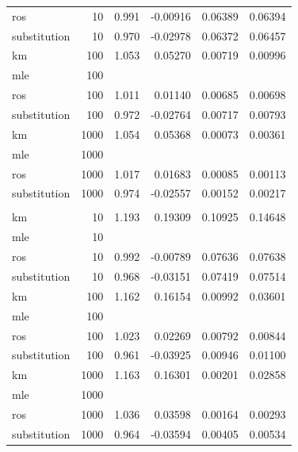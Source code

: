 \documentclass[12pt, twoside]{amherstthesis}
\begin{document}
\begin{table}
\begin{tabular}[t]{lrrrrr}
\hspace{1em}ros & 10 & 0.991 & -0.00916 & 0.06389 & 0.06394\\
\hspace{1em}substitution & 10 & 0.970 & -0.02978 & 0.06372 & 0.06457\\
\hspace{1em}km & 100 & 1.053 & 0.05270 & 0.00719 & 0.00996\\
\hspace{1em}mle & 100 &  &  &  \vphantom{1} & \\
\hspace{1em}ros & 100 & 1.011 & 0.01140 & 0.00685 & 0.00698\\
\hspace{1em}substitution & 100 & 0.972 & -0.02764 & 0.00717 & 0.00793\\
\hspace{1em}km & 1000 & 1.054 & 0.05368 & 0.00073 & 0.00361\\
\hspace{1em}mle & 1000 &  &  &  \vphantom{1} & \\
\hspace{1em}ros & 1000 & 1.017 & 0.01683 & 0.00085 & 0.00113\\
\hspace{1em}substitution & 1000 & 0.974 & -0.02557 & 0.00152 & 0.00217\\
\addlinespace[1em]
\multicolumn{6}{l}{\textbf{Censoring Rate = 0.5}}\\
\hspace{1em}km & 10 & 1.193 & 0.19309 & 0.10925 & 0.14648\\
\hspace{1em}mle & 10 &  &  &  & \\
\hspace{1em}ros & 10 & 0.992 & -0.00789 & 0.07636 & 0.07638\\
\hspace{1em}substitution & 10 & 0.968 & -0.03151 & 0.07419 & 0.07514\\
\hspace{1em}km & 100 & 1.162 & 0.16154 & 0.00992 & 0.03601\\
\hspace{1em}mle & 100 &  &  &  & \\
\hspace{1em}ros & 100 & 1.023 & 0.02269 & 0.00792 & 0.00844\\
\hspace{1em}substitution & 100 & 0.961 & -0.03925 & 0.00946 & 0.01100\\
\hspace{1em}km & 1000 & 1.163 & 0.16301 & 0.00201 & 0.02858\\
\hspace{1em}mle & 1000 &  &  &  & \\
\hspace{1em}ros & 1000 & 1.036 & 0.03598 & 0.00164 & 0.00293\\
\hspace{1em}substitution & 1000 & 0.964 & -0.03594 & 0.00405 & 0.00534\\
\bottomrule
\end{tabular}
\end{table}
\end{document}
